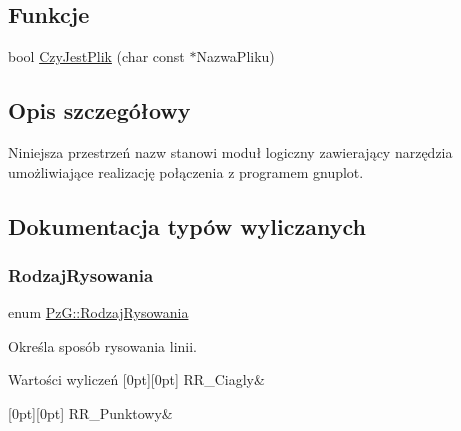 \subsection*{Funkcje}
\begin{DoxyCompactItemize}
\item 
bool \mbox{\hyperlink{namespace_pz_g_ae1ae4d36f66c77879380ba73da8e20e3}{Czy\+Jest\+Plik}} (char const $\ast$Nazwa\+Pliku)
\end{DoxyCompactItemize}


\subsection{Opis szczegółowy}
Niniejsza przestrzeń nazw stanowi moduł logiczny zawierający narzędzia umożliwiające realizację połączenia z programem {\ttfamily gnuplot}. 

\subsection{Dokumentacja typów wyliczanych}
\mbox{\label{namespace_pz_g_a705c92106f39b7d0c34a6739d10ff0b6}} 
\subsubsection{\texorpdfstring{RodzajRysowania}{RodzajRysowania}}
{\footnotesize\ttfamily enum \mbox{\hyperlink{namespace_pz_g_a705c92106f39b7d0c34a6739d10ff0b6}{Pz\+G\+::\+Rodzaj\+Rysowania}}}

Określa sposób rysowania linii. \begin{DoxyEnumFields}{Wartości wyliczeń}
[0pt][0pt]{}\mbox{\label{namespace_pz_g_a705c92106f39b7d0c34a6739d10ff0b6a927eaa159aa4bd3198f0a330b967746d}} 
R\+R\+\_\+\+Ciagly&\\
\hline

[0pt][0pt]{}\mbox{\label{namespace_pz_g_a705c92106f39b7d0c34a6739d10ff0b6aa01097ee8266d6402b752ef6f9a4690c}} 
R\+R\+\_\+\+Punktowy&\\
\hline

\end{DoxyEnumFields}



